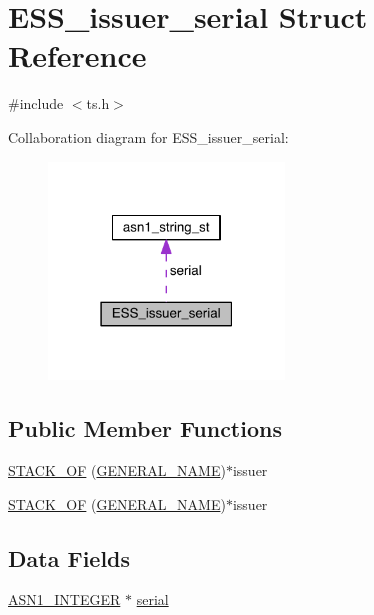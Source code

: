 \hypertarget{struct_e_s_s__issuer__serial}{}\section{E\+S\+S\+\_\+issuer\+\_\+serial Struct Reference}
\label{struct_e_s_s__issuer__serial}


{\ttfamily \#include $<$ts.\+h$>$}



Collaboration diagram for E\+S\+S\+\_\+issuer\+\_\+serial\+:\nopagebreak
\begin{figure}[H]
\begin{center}
\leavevmode
\includegraphics[width=178pt]{struct_e_s_s__issuer__serial__coll__graph}
\end{center}
\end{figure}
\subsection*{Public Member Functions}
\begin{DoxyCompactItemize}
\item 
\hyperlink{struct_e_s_s__issuer__serial_af157a0c20f6be28c7c7ac746d2ead242}{S\+T\+A\+C\+K\+\_\+\+OF} (\hyperlink{crypto_2x509v3_2x509v3_8h_a6688fb8a0c7b8e63f3d47bac3a09eb15}{G\+E\+N\+E\+R\+A\+L\+\_\+\+N\+A\+ME})$\ast$issuer
\item 
\hyperlink{struct_e_s_s__issuer__serial_af157a0c20f6be28c7c7ac746d2ead242}{S\+T\+A\+C\+K\+\_\+\+OF} (\hyperlink{crypto_2x509v3_2x509v3_8h_a6688fb8a0c7b8e63f3d47bac3a09eb15}{G\+E\+N\+E\+R\+A\+L\+\_\+\+N\+A\+ME})$\ast$issuer
\end{DoxyCompactItemize}
\subsection*{Data Fields}
\begin{DoxyCompactItemize}
\item 
\hyperlink{crypto_2ossl__typ_8h_af4335399bf9774cb410a5e93de65998b}{A\+S\+N1\+\_\+\+I\+N\+T\+E\+G\+ER} $\ast$ \hyperlink{struct_e_s_s__issuer__serial_ae89753d950d21e4c15c296fced78c1b6}{serial}
\end{DoxyCompactItemize}


